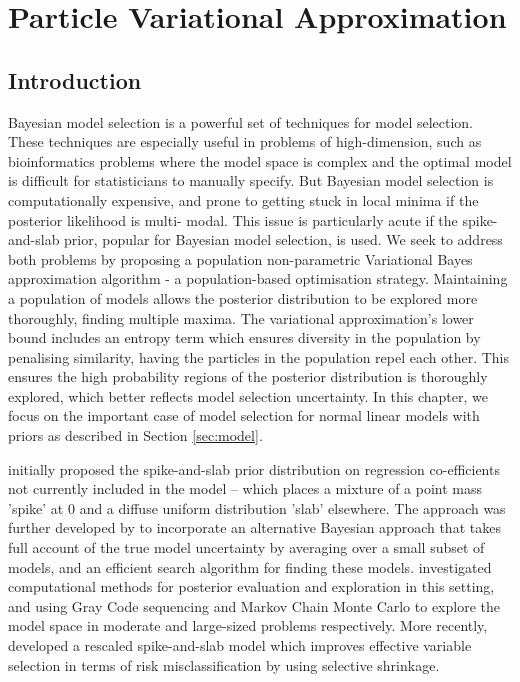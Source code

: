 \chapter{Particle Variational Approximation}

\setlength{\parindent}{0pt}

\section{Introduction}

Bayesian model selection is a powerful set of techniques for model selection. These techniques are especially
useful in problems of high-dimension, such as bioinformatics problems where the model space is complex and the
optimal model is difficult for statisticians to manually specify. But Bayesian model selection is
computationally expensive, and prone to getting stuck in local minima if the posterior likelihood is multi-
modal. This issue is particularly acute if the spike-and-slab prior, popular for Bayesian model
selection, is used. We seek to address both problems by proposing a population non-parametric Variational
Bayes approximation algorithm - a population-based optimisation strategy. Maintaining a population of models
allows the posterior distribution to be explored more thoroughly, finding multiple maxima. The variational
approximation's lower bound includes an entropy term which ensures diversity in the population by penalising
similarity,  having the particles in the population repel each other. This ensures the high probability
regions of the posterior distribution is thoroughly explored, which better reflects model selection
uncertainty. In this chapter, we focus on the important case of model selection for normal linear models with
priors as described in Section \ref{sec:model}.

\cite{Mitchell1988} initially proposed the spike-and-slab prior distribution on regression co-efficients not
currently included in the model -- which places a mixture of a point mass 'spike' at $0$ and a diffuse uniform
distribution 'slab' elsewhere. The approach was further developed by \cite{Madigan1994} to incorporate an
alternative Bayesian approach that takes full account of the true model uncertainty by averaging over a small
subset of models, and an efficient search algorithm for finding these models. \cite{George1997} investigated
computational methods for posterior evaluation and exploration in this setting, and using Gray Code sequencing
and Markov Chain Monte Carlo to explore the model space in moderate and large-sized problems respectively.
More recently, \cite{Ishwaran2005} developed a rescaled spike-and-slab model which improves effective variable
selection in terms of risk misclassification by using selective shrinkage.

